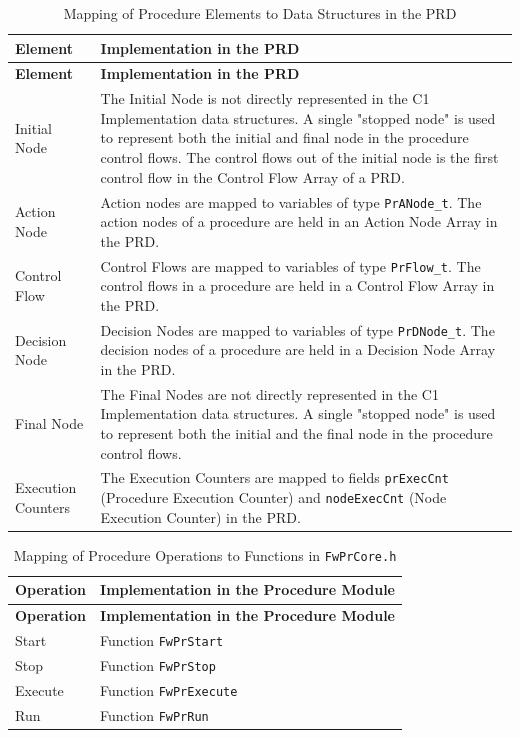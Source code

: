 \documentclass[a4paper,10pt]{article}
\begin{document}
\begin{longtable}{|p{2.7cm}|P{8.5cm}|}
\caption{Mapping of Procedure Elements to Data Structures in the PRD} 
\label{tab:PR_Elements_Implementation}\\
\hline
{}
\textbf{Element} & \textbf{Implementation in the PRD} \\
\hline
\endfirsthead
{}
\textbf{Element} & \textbf{Implementation in the PRD} \\
\hline
\endhead
Initial Node & The Initial Node is not directly represented in the C1 Implementation data structures. 
A single "stopped node" is used to represent both the initial and final node in the procedure control flows.
The control flows out of the initial node is the first control flow in the Control Flow Array of a PRD.\\
\hline
Action Node & Action nodes are mapped to variables of type \texttt{PrANode\_t}. 
The action nodes of a procedure are held in an Action Node Array in the PRD.\\
\hline
Control Flow & Control Flows are mapped to variables of type \texttt{PrFlow\_t}. 
The control flows in a procedure are held in a Control Flow Array in the PRD.\\
\hline
Decision Node & Decision Nodes are mapped to variables of type \texttt{PrDNode\_t}. 
The decision nodes of a procedure are held in a Decision Node Array in the PRD.\\
\hline
Final Node & The Final Nodes are not directly represented in the C1 Implementation data structures.
A single "stopped node" is used to represent both the initial and the final node in the procedure control flows.\\
\hline
Execution Counters & The Execution Counters are mapped to fields \texttt{prExecCnt} (Procedure Execution Counter) and
\texttt{nodeExecCnt} (Node Execution Counter) in the PRD.\\
\hline
\end{longtable}

\begin{longtable}{|p{3.7cm}|p{7.5cm}|}
\caption{Mapping of Procedure Operations to Functions in \texttt{FwPrCore.h}} 
\label{tab:PR_Operations_Implementation}\\
\hline
\rowcolor{gray}
\textbf{Operation} & \textbf{Implementation in the Procedure Module} \\
\hline
\endfirsthead
\rowcolor{gray}
\textbf{Operation} & \textbf{Implementation in the Procedure Module} \\
\hline
\endhead
Start & Function \texttt{FwPrStart} \\
\hline
Stop  & Function \texttt{FwPrStop} \\
\hline
Execute & Function \texttt{FwPrExecute} \\
\hline
Run & Function \texttt{FwPrRun} \\
\hline
\end{longtable}
\end{document}
